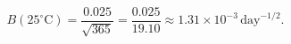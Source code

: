 \documentclass[preview]{standalone}
\begin{document}
\[
B(25^\circ\mathrm{C}) = \frac{0.025}{\sqrt{365}} = \frac{0.025}{19.10} \approx 1.31 \times 10^{-3}\,\mathrm{day}^{-1/2}.
\]
\end{document}
